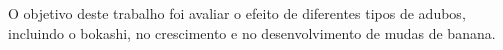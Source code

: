 O objetivo deste trabalho foi avaliar o efeito de diferentes tipos de adubos, incluindo o bokashi, no crescimento e no desenvolvimento de mudas de banana. 


